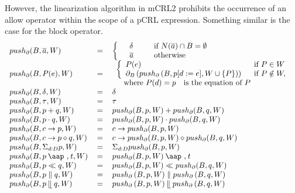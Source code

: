 \documentclass{article}
\providecommand{\at}{\mathbin{\mbox{\aap ,}}}
\providecommand{\leftmerge}{\mathbin{\mathrel{\llfloor}}}
\begin{document}
However, the linearization algorithm in mCRL2 prohibits the occurrence of an
allow operator within the scope of a pCRL expression. Something similar is
the case for the block operator.%
\[
\begin{tabular}{lll}
$push_{\partial }(B,\overline{a},W)$ & $=$ & $\left\{ \text{ }%
\begin{array}{lll}
\delta  &  & \text{if }N(\overline{a})\cap B=\emptyset  \\ 
\overline{a} &  & \text{otherwise}%
\end{array}%
\right. $ \\ 
$push_{\partial }(B,P(e),W)$ & $=$ & $%
\begin{array}{l}
\left\{ 
\begin{array}{ll}
P(e) & \text{if }P\in W \\ 
\partial _{B}\left( push_{\partial }\left( B,p[d:=e],W\cup \{P\}\right)
\right)  & \text{if }P\notin W,%
\end{array}%
\right.  \\ 
\text{ where }P(d)=p\text{ is the equation of }P%
\end{array}%
$ \\ 
$push_{\partial }(B,\delta ,W)$ & $=$ & $\delta $ \\ 
$push_{\partial }(B,\tau ,W)$ & $=$ & $\tau $ \\ 
$push_{\partial }(B,p+q,W)$ & $=$ & $push_{\partial }(B,p,W)+push_{\partial
}(B,q,W)$ \\ 
$push_{\partial }(B,p\cdot q,W)$ & $=$ & $push_{\partial }(B,p,W)\cdot
push_{\partial }(B,q,W)$ \\ 
$push_{\partial }(B,c\rightarrow p,W)$ & $=$ & $c\rightarrow push_{\partial
}(B,p,W)$ \\ 
$push_{\partial }(B,c\rightarrow p\diamond q,W)$ & $=$ & $c\rightarrow
push_{\partial }(B,p,W)\diamond push_{\partial }(B,q,W)$ \\ 
$push_{\partial }(B,\Sigma _{d:D}p,W)$ & $=$ & $\Sigma _{d:D}push_{\partial
}(B,p,W)$ \\ 
$push_{\partial }(B,p\at t,W)$ & $=$ & $push_{\partial }(B,p,W)\at t$ \\ 
$push_{\partial }(B,p\ll q,W)$ & $=$ & $push_{\partial }(B,p,W)\ll
push_{\partial }(B,q,W)$ \\ 
$push_{\partial }(B,p\parallel q,W)$ & $=$ & $push_{\partial }\left(
B,p,W\right) \parallel push_{\partial }\left( B,q,W\right) $ \\ 
$push_{\partial }(B,p\leftmerge q,W)$ & $=$ & $push_{\partial }\left(
B,p,W\right) \leftmerge push_{\partial }\left( B,q,W\right) $ \\ 

\end{tabular}\]
\end{document}
